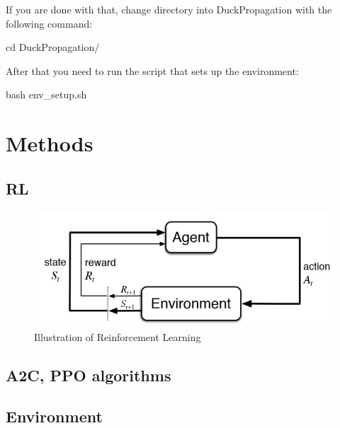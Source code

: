 \documentclass{article}
\begin{document}
If you are done with that, change directory into DuckPropagation with the following command:
\begin{center}
	cd DuckPropagation/
\end{center}
After that you need to run the script that sets up the environment:
\begin{center}
	bash env\_setup.sh
\end{center}

\section{\large{Methods}}

\subsection{\normalsize{RL}}

\begin{figure}[h!]
	\centering
	\includegraphics[width=0.8\linewidth]{rl.jpg}
	\caption{Illustration of Reinforcement Learning}
\end{figure}

\subsection{\normalsize{A2C, PPO algorithms}}

\subsection{\normalsize{Environment}}
\end{document}
